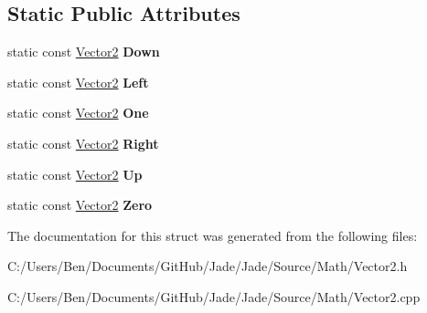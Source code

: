 \subsection*{Static Public Attributes}
\begin{DoxyCompactItemize}
\item 
\hypertarget{struct_jade_1_1_math_1_1_vector2_a827fde2f444706d916af6767a48c3612}{}static const \hyperlink{struct_jade_1_1_math_1_1_vector2}{Vector2} {\bfseries Down}\label{struct_jade_1_1_math_1_1_vector2_a827fde2f444706d916af6767a48c3612}

\item 
\hypertarget{struct_jade_1_1_math_1_1_vector2_ae44dafdf79ff9ec54e625a10e083b16c}{}static const \hyperlink{struct_jade_1_1_math_1_1_vector2}{Vector2} {\bfseries Left}\label{struct_jade_1_1_math_1_1_vector2_ae44dafdf79ff9ec54e625a10e083b16c}

\item 
\hypertarget{struct_jade_1_1_math_1_1_vector2_a041a5cd9d4aa2424bbeb3c4376acc2c5}{}static const \hyperlink{struct_jade_1_1_math_1_1_vector2}{Vector2} {\bfseries One}\label{struct_jade_1_1_math_1_1_vector2_a041a5cd9d4aa2424bbeb3c4376acc2c5}

\item 
\hypertarget{struct_jade_1_1_math_1_1_vector2_af41cfe8a3772848a19e833ec4e7e148d}{}static const \hyperlink{struct_jade_1_1_math_1_1_vector2}{Vector2} {\bfseries Right}\label{struct_jade_1_1_math_1_1_vector2_af41cfe8a3772848a19e833ec4e7e148d}

\item 
\hypertarget{struct_jade_1_1_math_1_1_vector2_aebc9bbc146e7e6e702d9b28d03220f55}{}static const \hyperlink{struct_jade_1_1_math_1_1_vector2}{Vector2} {\bfseries Up}\label{struct_jade_1_1_math_1_1_vector2_aebc9bbc146e7e6e702d9b28d03220f55}

\item 
\hypertarget{struct_jade_1_1_math_1_1_vector2_a7f61ccfd614cddb4d4468512decffb0f}{}static const \hyperlink{struct_jade_1_1_math_1_1_vector2}{Vector2} {\bfseries Zero}\label{struct_jade_1_1_math_1_1_vector2_a7f61ccfd614cddb4d4468512decffb0f}

\end{DoxyCompactItemize}


The documentation for this struct was generated from the following files\+:\begin{DoxyCompactItemize}
\item 
C\+:/\+Users/\+Ben/\+Documents/\+Git\+Hub/\+Jade/\+Jade/\+Source/\+Math/Vector2.\+h\item 
C\+:/\+Users/\+Ben/\+Documents/\+Git\+Hub/\+Jade/\+Jade/\+Source/\+Math/Vector2.\+cpp\end{DoxyCompactItemize}
